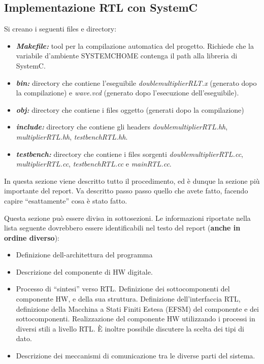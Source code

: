 \documentclass[]{IEEEtran}
\begin{document}
\subsection{Implementazione RTL con SystemC}
Si creano i seguenti files e directory:
\begin{itemize}
\item {\it\bf Makefile:} tool per la compilazione automatica del progetto. Richiede che la variabile d'ambiente SYSTEMC\textunderscore HOME contenga il path alla libreria di SystemC.
\item {\it\bf bin:} directory che contiene l'eseguibile {\it double\textunderscore multiplier\textunderscore RLT.x} (generato dopo la compilazione) e {\it wave.vcd} (generato dopo l'esecuzione dell'eseguibile).
\item {\it\bf obj:} directory che contiene i files oggetto (generati dopo la compilazione)
\item {\it\bf include:} directory che contiene gli headers {\it double\textunderscore multiplier\textunderscore RTL.hh}, {\it multiplier\textunderscore RTL.hh}, {\it testbench\textunderscore RTL.hh}.
\item {\it\bf testbench:} directory che contiene i files sorgenti {\it double\textunderscore multiplier\textunderscore RTL.cc}, {\it multiplier\textunderscore RTL.cc}, {\it testbench\textunderscore RTL.cc} e {\it main\textunderscore RTL.cc}.
\end{itemize}


In questa sezione viene descritto tutto il procedimento, ed è dunque la sezione più importante del report. Va descritto passo passo quello che avete fatto, facendo capire ``esattamente'' cosa è stato fatto.

Questa sezione può essere divisa in sottosezioni. Le informazioni riportate nella lista seguente dovrebbero essere identificabili nel testo del report (\textbf{anche in ordine diverso}):
\begin{itemize}
\item Definizione dell-architettura del programma
\item Descrizione del componente di HW digitale.
\item Processo di ``sintesi'' verso RTL. Definizione dei sottocomponenti del componente HW, e della sua struttura. Definizione dell'interfaccia RTL, definizione della Macchina a Stati Finiti Estesa (EFSM) del componente e dei sottocomponenti. Realizzazione del componente HW utilizzando i processi in diversi stili a livello RTL. \`E inoltre possibile discutere la scelta dei tipi di dato.
\item Descrizione dei meccanismi di comunicazione tra le diverse parti del sistema.
\end{itemize}
\end{document}
